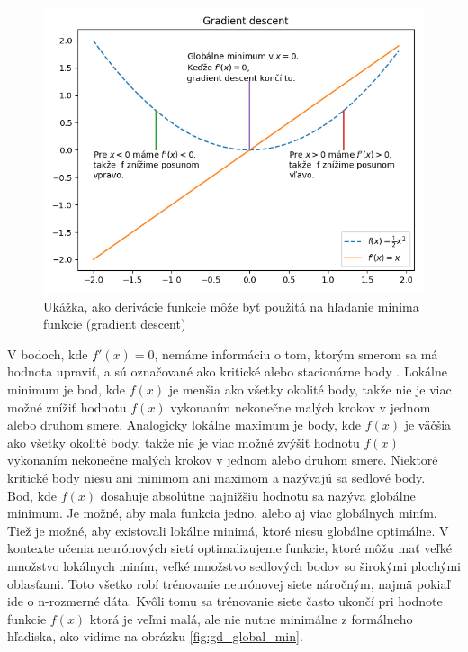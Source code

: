 \begin{figure}[H]
	\centering
	\includegraphics[width=1\linewidth]{img/gd}
	\caption{Ukážka, ako derivácie funkcie môže byť použitá na hľadanie minima funkcie (gradient descent)}
	\label{fig:gd}
\end{figure}

\indent V bodoch, kde $f'(x) = 0$, nemáme informáciu o tom, ktorým smerom sa má hodnota upraviť, a sú označované ako kritické alebo stacionárne body \cite{goodfellow2016deep}.
Lokálne minimum je bod, kde $f(x)$ je menšia ako všetky okolité body, takže nie je viac možné znížiť
hodnotu $f(x)$ vykonaním nekonečne malých krokov v jednom alebo druhom smere.
Analogicky lokálne maximum je body, kde $f(x)$ je väčšia ako všetky okolité body, takže nie je viac možné zvýšiť hodnotu $f(x)$ vykonaním nekonečne malých krokov v jednom alebo druhom smere.
Niektoré kritické body niesu ani minimom ani maximom a nazývajú sa sedlové body.\\

\indent Bod, kde $f(x)$ dosahuje absolútne najnižšiu hodnotu sa nazýva globálne minimum.
Je možné, aby mala funkcia jedno, alebo aj viac globálnych miním.
Tiež je možné, aby existovali lokálne minimá, ktoré niesu globálne optimálne.
V kontexte učenia neurónových sietí optimalizujeme funkcie, ktoré môžu mať veľké množstvo lokálnych miním, veľké množstvo sedlových bodov so širokými plochými oblasťami.
Toto všetko robí trénovanie neurónovej siete náročným, najmä pokiaľ ide o n-rozmerné dáta.
Kvôli tomu sa trénovanie siete často ukončí pri hodnote funkcie $f(x)$ ktorá je veľmi malá, ale 
nie nutne minimálne z formálneho hľadiska, ako vidíme na obrázku \ref{fig:gd_global_min}. \cite{goodfellow2016deep}

